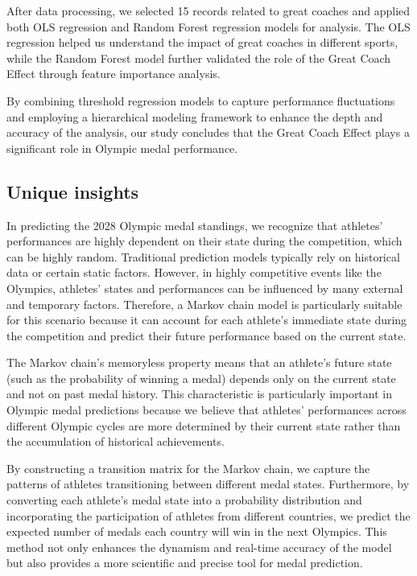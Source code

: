 \documentclass[12pt]{article}
\begin{document}
After data processing, we selected 15 records related to great coaches and applied both OLS regression and Random Forest regression models for analysis. The OLS regression helped us understand the impact of great coaches in different sports, while the Random Forest model further validated the role of the Great Coach Effect through feature importance analysis.

By combining threshold regression models to capture performance fluctuations and employing a hierarchical modeling framework to enhance the depth and accuracy of the analysis, our study concludes that the Great Coach Effect plays a significant role in Olympic medal performance.



\subsection{Unique insights}

In predicting the 2028 Olympic medal standings, we recognize that athletes' performances are highly dependent on their state during the competition, which can be highly random. Traditional prediction models typically rely on historical data or certain static factors. However, in highly competitive events like the Olympics, athletes' states and performances can be influenced by many external and temporary factors. Therefore, a Markov chain model is particularly suitable for this scenario because it can account for each athlete's immediate state during the competition and predict their future performance based on the current state.

The Markov chain's memoryless property means that an athlete's future state (such as the probability of winning a medal) depends only on the current state and not on past medal history. This characteristic is particularly important in Olympic medal predictions because we believe that athletes' performances across different Olympic cycles are more determined by their current state rather than the accumulation of historical achievements.

By constructing a transition matrix for the Markov chain, we capture the patterns of athletes transitioning between different medal states. Furthermore, by converting each athlete's medal state into a probability distribution and incorporating the participation of athletes from different countries, we predict the expected number of medals each country will win in the next Olympics. This method not only enhances the dynamism and real-time accuracy of the model but also provides a more scientific and precise tool for medal prediction.
\end{document}
